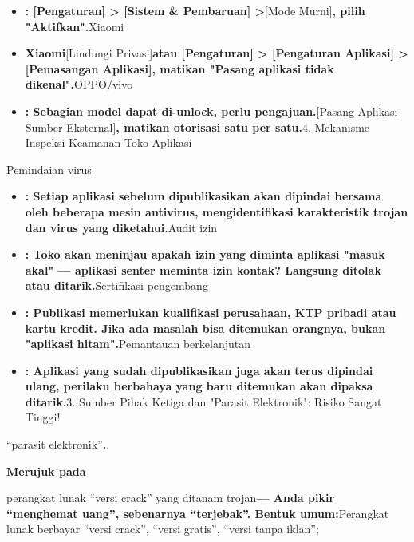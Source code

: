 
\begin{itemize}
  \item \textbf{: [Pengaturan] > [Sistem \& Pembaruan] >}[Mode Murni]\textbf{, pilih "Aktifkan".}Xiaomi
  \item \textbf{Xiaomi}[Lindungi Privasi]\textbf{atau [Pengaturan] > [Pengaturan Aplikasi] > [Pemasangan Aplikasi], matikan "Pasang aplikasi tidak dikenal".}OPPO/vivo
  \item \textbf{: Sebagian model dapat di-unlock, perlu pengajuan.}[Pasang Aplikasi Sumber Eksternal]\textbf{, matikan otorisasi satu per satu.}4. Mekanisme Inspeksi Keamanan Toko Aplikasi
\end{itemize}


Pemindaian virus

\begin{itemize}
  \item \textbf{: Setiap aplikasi sebelum dipublikasikan akan dipindai bersama oleh beberapa mesin antivirus, mengidentifikasi karakteristik trojan dan virus yang diketahui.}Audit izin
  \item \textbf{: Toko akan meninjau apakah izin yang diminta aplikasi "masuk akal" — aplikasi senter meminta izin kontak? Langsung ditolak atau ditarik.}Sertifikasi pengembang
  \item \textbf{: Publikasi memerlukan kualifikasi perusahaan, KTP pribadi atau kartu kredit. Jika ada masalah bisa ditemukan orangnya, bukan "aplikasi hitam".}Pemantauan berkelanjutan
  \item \textbf{: Aplikasi yang sudah dipublikasikan juga akan terus dipindai ulang, perilaku berbahaya yang baru ditemukan akan dipaksa ditarik.}3. Sumber Pihak Ketiga dan "Parasit Elektronik": Risiko Sangat Tinggi!
\end{itemize}


“parasit elektronik”\textbf{.}.

\textbf{Merujuk pada}\par

perangkat lunak “versi crack” yang ditanam trojan\textbf{— Anda pikir “menghemat uang”, sebenarnya “terjebak”. Bentuk umum:}Perangkat lunak berbayar “versi crack”, “versi gratis”, “versi tanpa iklan”;

